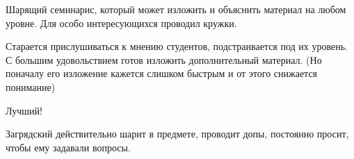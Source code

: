 			\begin{commentbox} 
				Шарящий семинарис, который может изложить и объяснить материал на любом уровне. Для особо интересующихся проводил кружки.  
			\end{commentbox} 
		
			\begin{commentbox} 
				Старается прислушиваться к мнению студентов, подстраивается под их уровень. С большим удовольствием готов изложить дополнительный материал. (Но поначалу его изложение кажется слишком быстрым и от этого снижается понимание) 
			\end{commentbox} 
		
			\begin{commentbox} 
				Лучший! 
			\end{commentbox} 
		
			\begin{commentbox} 
				Загрядский действительно шарит в предмете, проводит допы, постоянно просит, чтобы ему задавали вопросы. 
			\end{commentbox}
				

